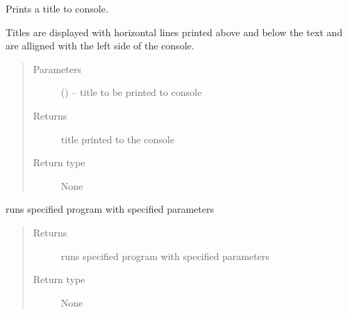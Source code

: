 \documentclass[letterpaper,10pt,english]{sphinxmanual}
\begin{document}
\begin{fulllineitems}
\begin{fulllineitems}
\begin{quote}
\begin{description}
\end{description}\end{quote}

\end{fulllineitems}


\begin{fulllineitems}
\label{\detokenize{MouseReferenceManual:Modules.Base.ModuleBaseClass.printTitle}}
Prints a title to console.

Titles are displayed with horizontal lines printed above and below the text and are alligned with the left side of the console.
\begin{quote}\begin{description}
\item[{Parameters}] \leavevmode
{} () -- title to be printed to console

\item[{Returns}] \leavevmode
title printed to the console

\item[{Return type}] \leavevmode
None

\end{description}\end{quote}

\end{fulllineitems}


\begin{fulllineitems}
\label{\detokenize{MouseReferenceManual:Modules.Base.ModuleBaseClass.run}}
runs specified program with specified parameters
\begin{quote}\begin{description}
\item[{Returns}] \leavevmode
runs specified program with specified parameters

\item[{Return type}] \leavevmode
None

\end{description}\end{quote}

\end{fulllineitems}



\end{fulllineitems}
\end{document}

